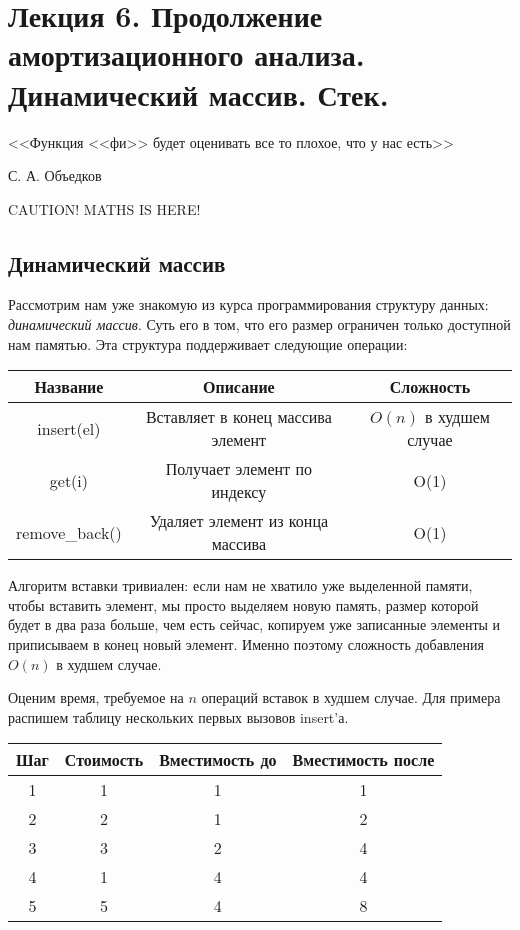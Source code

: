 \documentclass[../main.tex]{subfiles}
\begin{document}
	\section{Лекция 6. Продолжение амортизационного анализа. Динамический массив. Стек.}
	
	\epigraph{<<Функция <<фи>> будет оценивать все то плохое, что у нас есть>>}{С. А. Объедков}
	
	CAUTION! MATHS IS HERE!
	
	\subsection{Динамический массив}
	Рассмотрим нам уже знакомую из курса программирования структуру данных: \textit{динамический массив}. Суть его в том, что его размер ограничен только доступной нам памятью. Эта структура поддерживает следующие операции:
	
	\begin{center}
		\begin{tabular}{c|c|c}
			Название & Описание & Сложность \\ \hline
			insert(el) & Вставляет в конец массива элемент & $ O(n) $ в худшем случае \\ \hline
			get(i) & Получает элемент по индексу & O(1) \\ \hline
			remove\_back() & Удаляет элемент из конца массива & O(1) \\  %
		\end{tabular}
	\end{center}
	
	Алгоритм вставки тривиален: если нам не хватило уже выделенной памяти, чтобы вставить элемент, мы просто выделяем новую память, размер которой будет в два раза больше, чем есть сейчас, копируем уже записанные элементы и приписываем в конец новый элемент. Именно поэтому сложность добавления $O(n)$ в худшем случае.
	
	Оценим время, требуемое на $n$ операций вставок в худшем случае. Для примера распишем таблицу нескольких первых вызовов insert'а. 
	
	\begin{center}
		\begin{tabular}{c|c|c|c}
			Шаг & Стоимость & Вместимость до & Вместимость после \\ \hline
			1 & 1 & 1 & 1 \\ \hline
			2 & 2 & 1 & 2 \\ \hline
			3 & 3 & 2 & 4 \\ \hline
			4 & 1 & 4 & 4 \\ \hline
			5 & 5 & 4 & 8 \\ 
		\end{tabular}
	\end{center}
	
\end{document}
